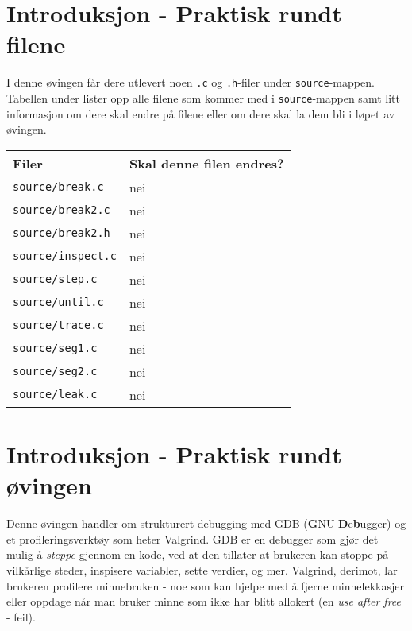 

\begin{alphasection}

\section{Introduksjon - Praktisk rundt filene}

I denne øvingen får dere utlevert noen \verb|.c| og \verb|.h|-filer under \verb|source|-mappen. Tabellen under lister opp alle filene som kommer med i \verb|source|-mappen samt litt informasjon om dere skal endre på filene eller om dere skal la dem bli i løpet av øvingen.

\begin{center}
 \begin{tabular}{|p{8.5cm} p{5.5cm}|} 
 \hline
 \textbf{Filer} & \textbf{Skal denne filen endres?}  \\ [0.5ex] 
 \hline\hline
  \verb|source/break.c| & nei  \\ 
 \hline
 \verb|source/break2.c| & nei  \\ 
 \hline
 \verb|source/break2.h| & nei  \\ 
 \hline
 \verb|source/inspect.c| & nei  \\ 
 \hline
 \verb|source/step.c| & nei  \\ 
 \hline
  \verb|source/until.c| & nei  \\ 
 \hline
  \verb|source/trace.c| & nei  \\ 
 \hline
  \verb|source/seg1.c| & nei  \\ 
 \hline
  \verb|source/seg2.c| & nei  \\ 
 \hline
  \verb|source/leak.c| & nei  \\ 
 \hline
\end{tabular}
\end{center}

\section{Introduksjon - Praktisk rundt øvingen}\label{sec:2-innføring}

Denne øvingen handler om strukturert debugging med GDB (\textbf{G}NU \textbf{D}e\textbf{b}ugger) og et profileringsverktøy som heter Valgrind. GDB er en debugger som gjør det mulig å \textit{steppe} gjennom en kode, ved at den tillater at brukeren kan stoppe på vilkårlige steder, inspisere variabler, sette verdier, og mer. Valgrind, derimot, lar brukeren profilere minnebruken - noe som kan hjelpe med å fjerne minnelekkasjer eller oppdage når man bruker minne som ikke har blitt allokert (en \textit{use after free} - feil).



\end{alphasection}
